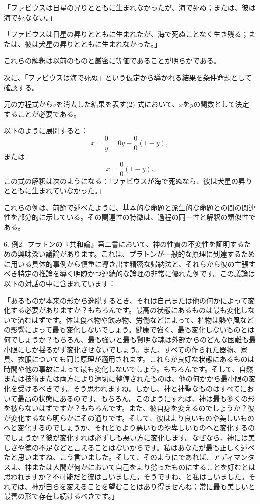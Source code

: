 \documentclass[a4paper,11pt,openany]{ltjsbook}
\begin{document}
「ファビウスは日星の昇りとともに生まれなかったが、海で死ぬ；または、彼は海で死なない。」

「ファビウスは日星の昇りとともに生まれたが、海で死ぬことなく生き残る；または、彼は犬星の昇りとともに生まれなかった。」

これらの解釈は以前のものと厳密に等価であることが明らかである。

次に、「ファビウスは海で死ぬ」という仮定から導かれる結果を条件命題として確認する。

元の方程式から$v$を消去した結果を表す(2) 式において、$x$を$y$の関数として決定することが必要である。

以下のように展開すると：
\[
x = \frac{0}{y} = 0y + \frac{0}{0}(1-y),
\]
または
\[
x = \frac{0}{0}(1-y).
\]
この式の解釈は次のようになる：「ファビウスが海で死ぬなら、彼は犬星の昇りとともに生まれていなかった。」

これらの例は、前節で述べたように、基本的な命題と派生的な命題との間の関連性を部分的に示している。その関連性の特徴は、過程の同一性と解釈の類似性である。

6. 例2.--プラトンの『共和論』第二書において、神の性質の不変性を証明するための興味深い議論があります。これは、プラトンが一般的な原理に到達するために用いる具体的事例から慎重に導き出す精密な帰納法と、それらから彼の主張すべき特定の推論を導く明瞭かつ連続的な論理の非常に優れた例です。この議論は以下の対話の中に含まれています：

「あるものが本来の形から逸脱するとき、それは自己または他の何かによって変化する必要がありますか？もちろんです。最高の状態にあるものは最も変化しないで済むはずです。体は食べ物や飲み物、労働などによって、植物は熱や風などの影響によって最も変化しないでしょう。健康で強く、最も変化しないものとは何でしょうか？もちろん、最も強いと最も賢明な魂は外部からのどんな困難も最小限にしか揺るがず変化させないでしょう。また、すべての作られた器物、家具、衣服についても同じ原理が適用されます。これらが良好な状態にあるものは時間や他の事故によって最も変化しないでしょう。もちろんです。そして、自然または技術または両方により適切に整備されたものは、他の何かから最小限の変化を受けるべきです。そう思われますね。しかし、神と神聖なものはすべてにおいて最高の状態にあるのです。もちろん。このようにすれば、神は最も多くの形を被らないはずですか？もちろんです。また、彼自身を変えるのでしょうか？彼が変化するなら明らかにその通りです。そして、彼はより良いものや美しいものへと変化するのでしょうか、それともより悪いものや卑しいものへと変化するのでしょうか？彼が変化すれば必ずしも悪い方に変化します。なぜなら、神には美しさや徳の不足などと言えることはないからです。私はあなたが最も正しく述べたと思いますね、こう言いました。そして、そのようにであれば、アディマンタスよ、神または人間が何かにおいて自己をより劣ったものにすることを好むとは思われますか？不可能だと彼は言いました。そうですね、と私は言いました。それでは、神が自らを変えることを望むことはあり得ませんね；常に最も美しいと最善の形で存在し続けるべきです。」
\end{document}
